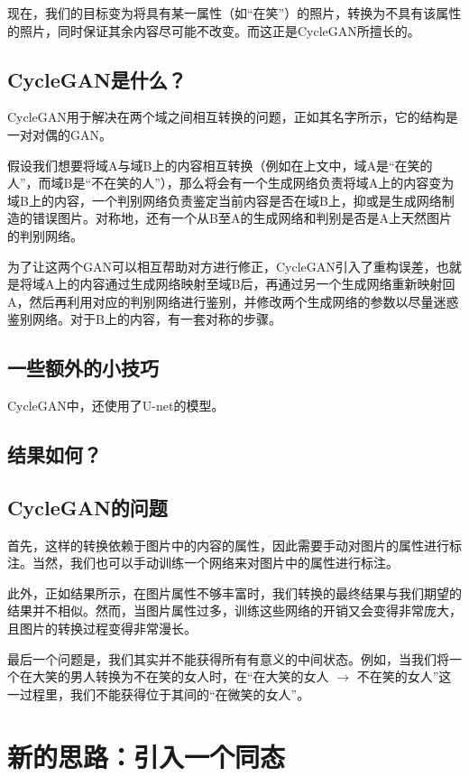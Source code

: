 \documentclass[UTF8,a4paper，12pt]{article}
\theoremstyle{theorem}
\theoremstyle{definition}
\begin{document}
现在，我们的目标变为将具有某一属性（如“在笑”）的照片，转换为不具有该属性的照片，同时保证其余内容尽可能不改变。而这正是CycleGAN所擅长的。

\subsection{CycleGAN是什么？}

CycleGAN用于解决在两个域之间相互转换的问题，正如其名字所示，它的结构是一对对偶的GAN。

假设我们想要将域A与域B上的内容相互转换（例如在上文中，域A是“在笑的人”，而域B是“不在笑的人”），那么将会有一个生成网络负责将域A上的内容变为域B上的内容，一个判别网络负责鉴定当前内容是否在域B上，抑或是生成网络制造的错误图片。对称地，还有一个从B至A的生成网络和判别是否是A上天然图片的判别网络。

为了让这两个GAN可以相互帮助对方进行修正，CycleGAN引入了重构误差，也就是将域A上的内容通过生成网络映射至域B后，再通过另一个生成网络重新映射回A，然后再利用对应的判别网络进行鉴别，并修改两个生成网络的参数以尽量迷惑鉴别网络。对于B上的内容，有一套对称的步骤。

\subsection{一些额外的小技巧}

CycleGAN中，还使用了U-net的模型。



\subsection{结果如何？}

\subsection{CycleGAN的问题}

首先，这样的转换依赖于图片中的内容的属性，因此需要手动对图片的属性进行标注。当然，我们也可以手动训练一个网络来对图片中的属性进行标注。

此外，正如结果所示，在图片属性不够丰富时，我们转换的最终结果与我们期望的结果并不相似。然而，当图片属性过多，训练这些网络的开销又会变得非常庞大，且图片的转换过程变得非常漫长。

最后一个问题是，我们其实并不能获得所有有意义的中间状态。例如，当我们将一个在大笑的男人转换为不在笑的女人时，在“在大笑的女人 $\rightarrow$ 不在笑的女人”这一过程里，我们不能获得位于其间的“在微笑的女人”。

\section{新的思路：引入一个同态}
\end{document}
